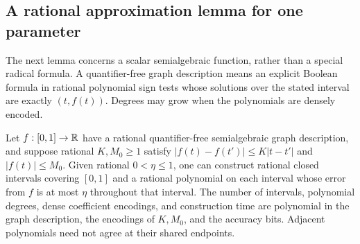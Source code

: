 \subsection{A rational approximation lemma for one parameter}

The next lemma concerns a scalar semialgebraic function, rather than a
special radical formula. A quantifier-free graph description means an
explicit Boolean formula in rational polynomial sign tests whose
solutions over the stated interval are exactly $(t,f(t))$. Degrees may
grow when the polynomials are densely encoded.

\begin{lemma}
\label{lem:a-wblk-univariate}
Let $f:[0,1]\to\mathbb{R}$ have a rational quantifier-free semialgebraic graph
description, and suppose rational $K,M_0\ge1$ satisfy
$|f(t)-f(t')|\le K|t-t'|$ and $|f(t)|\le M_0$.
Given rational $0<\eta\le1$, one can construct rational closed intervals
covering $[0,1]$ and a rational polynomial on each interval whose error
from $f$ is at most $\eta$ throughout that interval. The number of
intervals, polynomial degrees, dense coefficient encodings, and
construction time are polynomial in the graph description, the encodings
of $K,M_0$, and the accuracy bits. Adjacent polynomials need not agree at
their shared endpoints.
\end{lemma}
